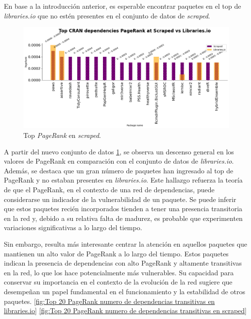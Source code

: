 En base a la introducción anterior, es esperable encontrar paquetes en el top de \textit{libraries.io}
que no estén presentes en el conjunto de datos de \textit{scraped}.

\begin{figure}[ht!]
    \begin{center}
        \includegraphics[width=1\textwidth]{img/cran/pr_top2.png}
        \caption{Top \textit{PageRank} en \textit{scraped}.}
        \label{fig:cran_pr_scraped_top}
    \end{center}
\end{figure}

A partir del nuevo conjunto de datos \ref{fig:cran_pr_scraped_top}, se observa un descenso general en los
valores de PageRank en comparación con el conjunto de datos de \textit{libraries.io}. Además, se destaca
que un gran número de paquetes han ingresado al top de PageRank y no estaban presentes en \textit{libraries.io}.
Este hallazgo refuerza la teoría de que el PageRank, en el contexto de una red de dependencias, puede
considerarse un indicador de la vulnerabilidad de un paquete. Se puede inferir que estos paquetes recién
incorporados tienden a tener una presencia transitoria en la red y, debido a su relativa falta de madurez,
es probable que experimenten variaciones significativas a lo largo del tiempo.

Sin embargo, resulta más interesante centrar la atención en aquellos paquetes que mantienen un alto valor de
PageRank a lo largo del tiempo. Estos paquetes indican la presencia de dependencias con alto PageRank y altamente
transitivas en la red, lo que los hace potencialmente más vulnerables. Su capacidad para conservar su
importancia en el contexto de la evolución de la red sugiere que desempeñan un papel fundamental en el
funcionamiento y la estabilidad de otros paquetes. \ref{fig:Top 20 PageRank numero de dependencias transitivas en libraries.io}
\ref{fig:Top 20 PageRank numero de dependencias transitivas en scraped}

